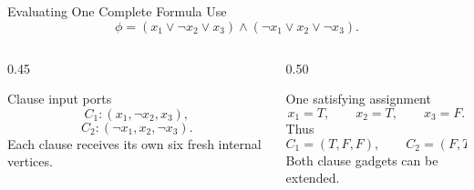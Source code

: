 \documentclass[aspectratio=43,8pt]{beamer}
\begin{document}
\begin{frame}{Evaluating One Complete Formula}
Use
\[
\phi=(x_1\vee \neg x_2\vee x_3)\land(\neg x_1\vee x_2\vee \neg x_3).
\]

\vspace{0.25cm}
\begin{columns}[T]
\begin{column}{0.45\textwidth}
\begin{block}{Clause input ports}
\[
C_1:(x_1,\neg x_2,x_3),
\]
\[
C_2:(\neg x_1,x_2,\neg x_3).
\]
Each clause receives its own six fresh internal vertices.
\end{block}
\end{column}
\begin{column}{0.50\textwidth}
\begin{block}{One satisfying assignment}
\[
x_1=T,\qquad x_2=T,\qquad x_3=F.
\]
Thus
\[
C_1=(T,F,F),\qquad C_2=(F,T,T).
\]
Both clause gadgets can be extended.
\end{block}
\end{column}
\end{columns}
\end{frame}
\end{document}
